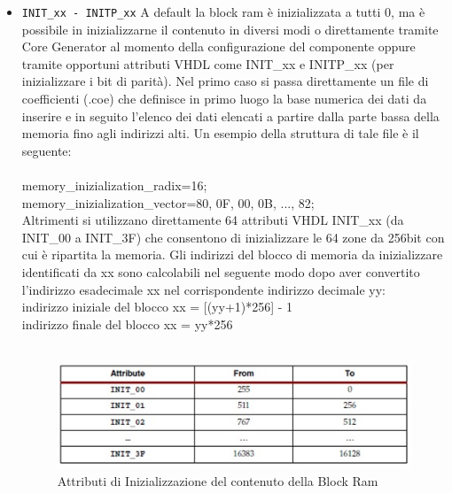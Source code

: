 \begin{itemize}
  \item \texttt{INIT\_xx - INITP\_xx}
A default la block ram \`e inizializzata a tutti 0, ma \`e possibile in inizializzarne il contenuto in diversi modi o direttamente tramite Core Generator al momento della configurazione del componente oppure tramite opportuni attributi VHDL come INIT\_xx e INITP\_xx (per inizializzare i bit di parit\`a). 
Nel primo caso si passa direttamente un file di coefficienti (.coe) che definisce in primo luogo la base numerica dei dati da inserire e in seguito l'elenco dei dati elencati a partire dalla parte bassa della memoria fino agli indirizzi alti. Un esempio della struttura di tale file \`e il seguente:\\\\
	memory\_inizialization\_radix=16;\\
	memory\_inizialization\_vector=80, 0F, 00, 0B, ..., 82;\\

Altrimenti si utilizzano direttamente 64 attributi VHDL INIT\_xx (da INIT\_00 a INIT\_3F) che consentono di inizializzare le 64 zone da 256bit con cui \`e ripartita la memoria. Gli indirizzi del blocco di memoria da inizializzare identificati da xx sono calcolabili nel seguente modo dopo aver convertito l'indirizzo esadecimale xx nel corrispondente indirizzo decimale yy:
\\
indirizzo iniziale del blocco xx = [(yy+1)*256] - 1\\
indirizzo finale del blocco xx = yy*256\\
\\
\begin{figure}[!h]
\centering
\includegraphics[width=\textwidth]{img/blockRam/init.jpg}
\caption{Attributi di Inizializzazione del contenuto della Block Ram}
\label{fig:set_ass}
\end{figure}


\end{itemize}
